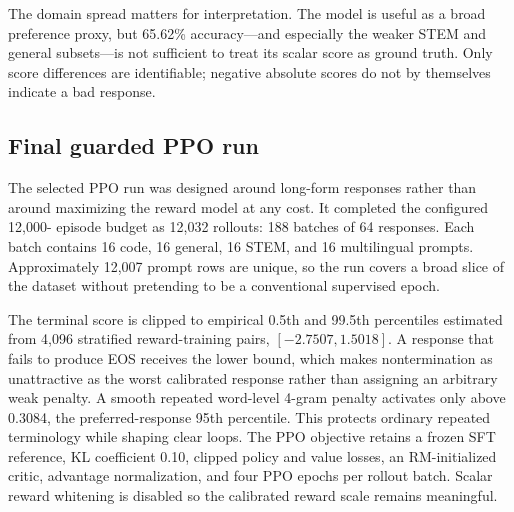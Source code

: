 \documentclass[11pt]{article}
\begin{document}
The domain spread matters for interpretation. The model is useful as a broad
preference proxy, but 65.62\% accuracy---and especially the weaker STEM and
general subsets---is not sufficient to treat its scalar score as ground truth.
Only score differences are identifiable; negative absolute scores do not by
themselves indicate a bad response.

\subsection{Final guarded PPO run}

The selected PPO run was designed around long-form responses rather than around
maximizing the reward model at any cost. It completed the configured 12,000-
episode budget as 12,032 rollouts: 188 batches of 64 responses. Each batch
contains 16 code, 16 general, 16 STEM, and 16 multilingual prompts. Approximately
12,007 prompt rows are unique, so the run covers a broad slice of the dataset
without pretending to be a conventional supervised epoch.

The terminal score is clipped to empirical 0.5th and 99.5th percentiles
estimated from 4,096 stratified reward-training pairs,
$[-2.7507,1.5018]$. A response that fails to produce EOS receives the lower
bound, which makes nontermination as unattractive as the worst calibrated
response rather than assigning an arbitrary weak penalty. A smooth repeated
word-level 4-gram penalty activates only above 0.3084, the preferred-response
95th percentile. This protects ordinary repeated terminology while shaping
clear loops. The PPO objective retains a frozen SFT reference, KL coefficient
0.10, clipped policy and value losses, an RM-initialized critic, advantage
normalization, and four PPO epochs per rollout batch. Scalar reward whitening
is disabled so the calibrated reward scale remains meaningful.
\end{document}
